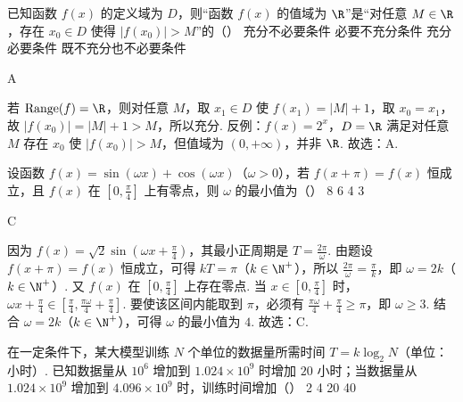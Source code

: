 \documentclass[UTF8,a4paper,oneside,11pt]{ctexbook}
\begin{document}
\begin{problem}
已知函数 \(f(x)\) 的定义域为 \(D\)，则“函数 \(f(x)\) 的值域为 \(\R\)”是“对任意 \(M\in\R\)，存在 \(x_0\in D\) 使得 \(|f(x_0)|>M\)”的（\quad）
\choices
    {充分不必要条件}
    {必要不充分条件}
    {充分必要条件}
    {既不充分也不必要条件}
\end{problem}

\begin{answer}
A
\end{answer}

\begin{solution}
若 \(\mathrm{Range}(f)=\R\)，则对任意 \(M\)，取 \(x_1\in D\) 使 \(f(x_1)=|M|+1\)，取 \(x_0=x_1\)，故 \(|f(x_0)|=|M|+1>M\)，所以充分. 反例：\(f(x)=2^x\)，\(D=\R\) 满足对任意 \(M\) 存在 \(x_0\) 使 \(|f(x_0)|>M\)，但值域为 \((0,+\infty)\)，并非 \(\R\). 故选：A.
\end{solution}

\begin{problem}
设函数 \(f(x)=\sin(\omega x)+\cos(\omega x)\)（\(\omega>0\)），若 \(f(x+\pi)=f(x)\) 恒成立，且 \(f(x)\) 在 \(\left[0,\frac{\pi}{4}\right]\) 上有零点，则 \(\omega\) 的最小值为（\quad）
\choices
    {8}
    {6}
    {4}
    {3}
\end{problem}

\begin{answer}
C
\end{answer}

\begin{solution}
因为 \(f(x)=\sqrt{2}\sin\left(\omega x+\frac{\pi}{4}\right)\)，其最小正周期是 \(T=\frac{2\pi}{\omega}\).
由题设 \(f(x+\pi)=f(x)\) 恒成立，可得 \(kT=\pi\)（\(k\in\N^+\)），所以 \(\frac{2\pi}{\omega}=\frac{\pi}{k}\)，即 \(\omega=2k\)（\(k\in\N^+\)）.
又 \(f(x)\) 在 \(\left[0,\frac{\pi}{4}\right]\) 上存在零点. 当 \(x\in\left[0,\frac{\pi}{4}\right]\) 时，\(\omega x+\frac{\pi}{4}\in\left[\frac{\pi}{4},\frac{\pi\omega}{4}+\frac{\pi}{4}\right]\). 要使该区间内能取到 \(\pi\)，必须有 \(\frac{\pi\omega}{4}+\frac{\pi}{4}\ge\pi\)，即 \(\omega\ge3\).
结合 \(\omega=2k\)（\(k\in\N^+\)），可得 \(\omega\) 的最小值为 \(4\). 故选：C.
\end{solution}

\begin{problem}
在一定条件下，某大模型训练 \(N\) 个单位的数据量所需时间 \(T=k\log_2 N\)（单位：小时）. 已知数据量从 \(10^6\) 增加到 \(1.024\times10^9\) 时增加 \(20\) 小时；当数据量从 \(1.024\times10^9\) 增加到 \(4.096\times10^9\) 时，训练时间增加（\quad）
\choices
    {2}
    {4}
    {20}
    {40}
\end{problem}
\end{document}
